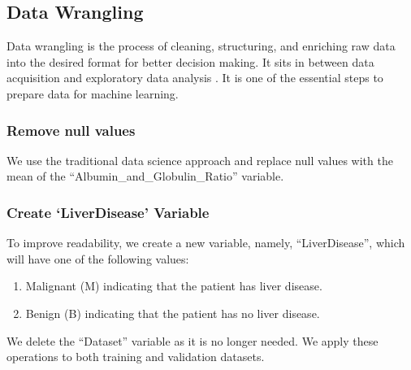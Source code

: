 \documentclass[]{article}
\newenvironment{Shaded}{\begin{snugshade}}{\end{snugshade}}
\newcommand{\CommentTok}[1]{\textcolor[rgb]{0.56,0.35,0.01}{\textit{#1}}}
\newcommand{\DataTypeTok}[1]{\textcolor[rgb]{0.13,0.29,0.53}{#1}}
\newcommand{\KeywordTok}[1]{\textcolor[rgb]{0.13,0.29,0.53}{\textbf{#1}}}
\newcommand{\NormalTok}[1]{#1}
\newcommand{\OperatorTok}[1]{\textcolor[rgb]{0.81,0.36,0.00}{\textbf{#1}}}
\newcommand{\OtherTok}[1]{\textcolor[rgb]{0.56,0.35,0.01}{#1}}
\newcommand{\StringTok}[1]{\textcolor[rgb]{0.31,0.60,0.02}{#1}}
\begin{document}
\subsection{Data Wrangling}
\label{sec:dw}
Data wrangling is the process of cleaning, structuring, and enriching raw data into the desired format for better decision making. It sits in between data acquisition and exploratory data analysis \cite{dw}. It is one of the essential steps to prepare data for machine learning.
\subsubsection{Remove null values}

We use the traditional data science approach and replace null values
with the mean of the ``Albumin\_and\_Globulin\_Ratio'' variable.

\begin{Shaded}
\end{Shaded}

\subsubsection{Create `LiverDisease' Variable}

To improve readability, we create a new variable, namely,
``LiverDisease'', which will have one of the following values:

\begin{enumerate}
\item Malignant (M) indicating that the patient has liver disease.
\item Benign (B) indicating that the patient has no liver disease.
\end{enumerate}

We delete the ``Dataset'' variable as it is no longer needed. We
apply these operations to both training and validation datasets.
\end{document}
